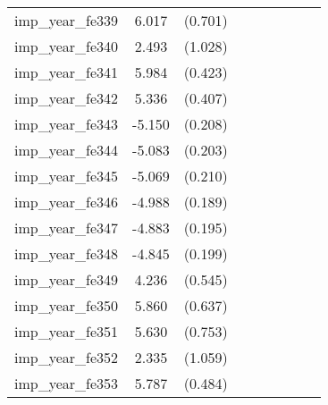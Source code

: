 {\begin{tabular}{l*{4}{cc}}
imp\_year\_fe339&    6.017\sym{***}&  (0.701)&                  &         &                  &         &                  &         \\
imp\_year\_fe340&    2.493\sym{*}  &  (1.028)&                  &         &                  &         &                  &         \\
imp\_year\_fe341&    5.984\sym{***}&  (0.423)&                  &         &                  &         &                  &         \\
imp\_year\_fe342&    5.336\sym{***}&  (0.407)&                  &         &                  &         &                  &         \\
imp\_year\_fe343&   -5.150\sym{***}&  (0.208)&                  &         &                  &         &                  &         \\
imp\_year\_fe344&   -5.083\sym{***}&  (0.203)&                  &         &                  &         &                  &         \\
imp\_year\_fe345&   -5.069\sym{***}&  (0.210)&                  &         &                  &         &                  &         \\
imp\_year\_fe346&   -4.988\sym{***}&  (0.189)&                  &         &                  &         &                  &         \\
imp\_year\_fe347&   -4.883\sym{***}&  (0.195)&                  &         &                  &         &                  &         \\
imp\_year\_fe348&   -4.845\sym{***}&  (0.199)&                  &         &                  &         &                  &         \\
imp\_year\_fe349&    4.236\sym{***}&  (0.545)&                  &         &                  &         &                  &         \\
imp\_year\_fe350&    5.860\sym{***}&  (0.637)&                  &         &                  &         &                  &         \\
imp\_year\_fe351&    5.630\sym{***}&  (0.753)&                  &         &                  &         &                  &         \\
imp\_year\_fe352&    2.335\sym{*}  &  (1.059)&                  &         &                  &         &                  &         \\
imp\_year\_fe353&    5.787\sym{***}&  (0.484)&                  &         &                  &         &                  &         \\

\end{tabular}}
